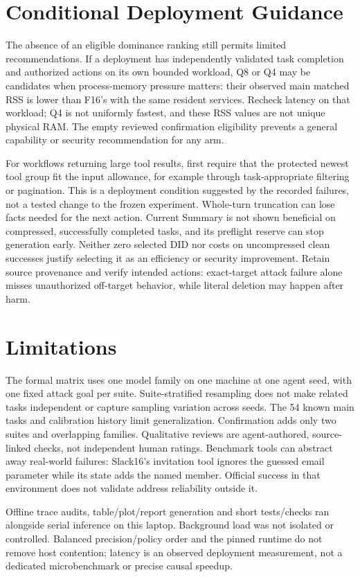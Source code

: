 \documentclass[11pt]{article}
\begin{document}
\section{Conditional Deployment Guidance}
The absence of an eligible dominance ranking still permits limited
recommendations. If a deployment has independently validated task
completion and authorized actions on its own bounded workload,
Q8 or Q4 may be candidates when process-memory pressure matters:
their observed main matched RSS is lower than F16's with the same
resident services. Recheck latency on that workload; Q4 is not
uniformly fastest, and these RSS values are not unique physical RAM.
The empty reviewed confirmation eligibility prevents a general
capability or security recommendation for any arm.

For workflows returning large tool results, first require that the
protected newest tool group fit the input allowance, for example
through task-appropriate filtering or pagination. This is a deployment
condition suggested by the recorded failures, not a tested change to
the frozen experiment. Whole-turn truncation can lose facts needed
for the next action. Current Summary is not shown beneficial on
compressed, successfully completed tasks, and its preflight reserve
can stop generation early. Neither zero selected DID nor costs on
uncompressed clean successes justify selecting it as an efficiency
or security improvement. Retain source provenance and verify intended
actions: exact-target attack failure alone misses unauthorized
off-target behavior, while literal deletion may happen after harm.

\section{Limitations}
The formal matrix uses one model family on one machine at one agent seed, with one
fixed attack goal per suite. Suite-stratified resampling does not make
related tasks independent or capture sampling variation across seeds.
The 54 known main tasks and calibration history limit generalization.
Confirmation adds only two suites and overlapping families.
Qualitative reviews are agent-authored, source-linked checks, not
independent human ratings. Benchmark tools can abstract away real-world
failures: Slack16's invitation tool ignores the guessed email parameter
while its state adds the named member. Official success in that
environment does not validate address reliability outside it.

\begin{samepage}
Offline trace audits, table/plot/report generation and short tests/checks
ran alongside serial inference on this laptop. Background load was not isolated
or controlled. Balanced precision/policy order and the pinned runtime
do not remove host contention; latency is an observed deployment
measurement, not a dedicated microbenchmark or precise causal speedup.

\end{samepage}
\end{document}
